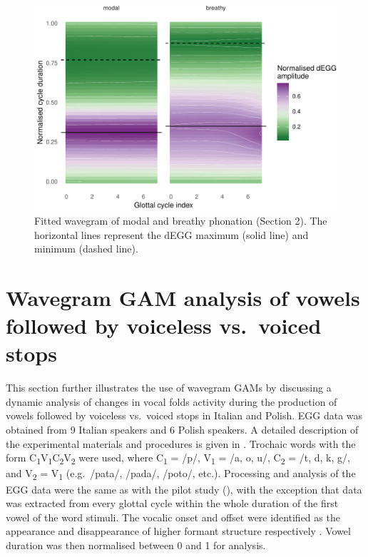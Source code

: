 \documentclass[
  11pt,
  a4paper,
]{article}
\begin{document}
\begin{figure}
\includegraphics[width=\linewidth]{2019-wavegram_files/figure-latex/surface-p-1} \caption{Fitted wavegram of modal and breathy phonation (Section 2). The horizontal lines represent the dEGG maximum (solid line) and minimum (dashed line).}\label{f:surface-p}
\end{figure}

\hypertarget{wavegram-gam-analysis-of-vowels-followed-by-voiceless-vs.-voiced-stops}{%
\section{Wavegram GAM analysis of vowels followed by voiceless
vs.~voiced
stops}\label{wavegram-gam-analysis-of-vowels-followed-by-voiceless-vs.-voiced-stops}}

\label{s:voicing}

This section further illustrates the use of wavegram GAMs by discussing
a dynamic analysis of changes in vocal folds activity during the
production of vowels followed by voiceless vs.~voiced stops in Italian
and Polish. EGG data was obtained from 9 Italian speakers and 6 Polish
speakers. A detailed description of the experimental materials and
procedures is given in \citet{coretta2018j}. Trochaic words with the
form
C\textsubscript{1}V\textsubscript{1}C\textsubscript{2}V\textsubscript{2}
were used, where C\textsubscript{1} = /p/, V\textsubscript{1} = /a, o,
u/, C\textsubscript{2} = /t, d, k, g/, and V\textsubscript{2} =
V\textsubscript{1} (e.g.~/pata/, /pada/, /poto/, etc.). Processing and
analysis of the EGG data were the same as with the pilot study
(), with the exception that data was extracted from every
glottal cycle within the whole duration of the first vowel of the word
stimuli. The vocalic onset and offset were identified as the appearance
and disappearance of higher formant structure respectively
\citep{machac2009}. Vowel duration was then normalised between 0 and 1
for analysis.
\end{document}
